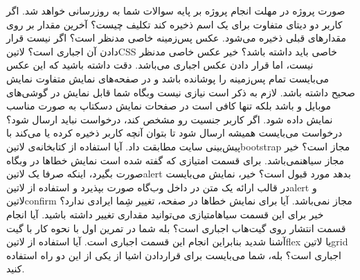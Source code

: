 \documentclass[../main.tex]{subfiles}
\begin{document}

صورت پروژه در مهلت انجام پروژه بر پایه سوالات شما به روزرسانی خواهد شد.
 اگر کاربر دو دیتای متفاوت برای یک اسم ذخیره کند تکلیف چیست؟
 آخرین مقدار بر روی مقدارهای قبلی ذخیره می‌شود.
 عکس پس‌زمینه خاصی مدنظر است؟ اگر نیست قرار دادن آن اجباری است؟ ‌لاتین{CSS} خاصی باید داشته باشد؟
 خیر عکس خاصی مدنظر نیست، اما قرار دادن عکس اجباری می‌باشد. دقت داشته باشید که این عکس می‌بایست تمام پس‌زمینه را پوشانده باشد و در صفحه‌های نمایش متفاوت نمایش صحیح داشته باشد. لازم به ذکر است نیازی نیست وبگاه شما قابل نمایش در گوشی‌های موبایل و  باشد بلکه تنها کافی است در صفحات نمایش دسکتاپ به صورت مناسب نمایش داده شود.
 اگر کاربر جنسیت رو مشخص کند، درخواست نباید ارسال شود؟
 درخواست می‌بایست همیشه ارسال شود تا بتوان آنچه کاربر ذخیره کرده یا می‌کند با پیش‌بینی سایت مطابقت داد.
 آیا استفاده از کتابخانه‌ی ‌لاتین{bootstrap} مجاز است؟
 خیر مجاز ‌سیاه{نمی‌باشد}.
 برای قسمت امتیازی که گفته شده است نمایش خطاها در وبگاه صورت بگیرد، اینکه صرفا یک ‌لاتین{alert} بدهد مورد قبول است؟
 خیر، نمایش می‌بایست در قالب ارائه یک متن در داخل وب‌گاه صورت بپذیرد و استفاده از ‌لاتین{alert} و ‌لاتین{confirm} مجاز نمی‌باشد.
 آیا برای نمایش خطاها در صفحه، تغییر شِما ایرادی ندارد؟
 خیر برای این قسمت ‌سیاه{امتیازی} می‌توانید مقداری تغییر داشته باشید.
 آیا انجام قسمت انتشار روی گیت‌هاب اجباری است؟
 بله شما در تمرین اول با نحوه کار با گیت آشنا شدید بنابراین انجام این قسمت اجباری است.
 آیا استفاده از ‌لاتین{flex} یا ‌لاتین{grid} اجباری است؟
 بله، شما می‌بایست برای قراردادن اشیا از یکی از این دو راه استفاده کنید.
\end{document}
